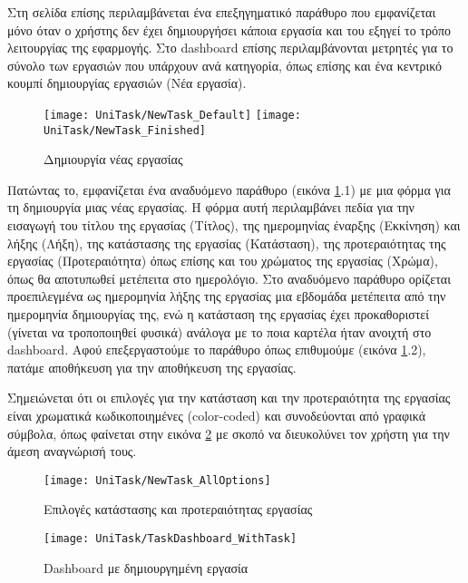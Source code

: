         Στη σελίδα επίσης περιλαμβάνεται ένα επεξηγηματικό παράθυρο που εμφανίζεται μόνο όταν ο χρήστης δεν έχει δημιουργήσει κάποια εργασία και του εξηγεί το τρόπο λειτουργίας της εφαρμογής. Στο {\Zona dashboard} επίσης περιλαμβάνονται μετρητές για το σύνολο των εργασιών που υπάρχουν ανά κατηγορία, όπως επίσης και ένα κεντρικό κουμπί δημιουργίας εργασιών ({\Zona Νέα εργασία}).

        \begin{figure}[h!] \noindent \centering
            \texttt{[image: UniTask/NewTask\_Default]}
            \texttt{[image: UniTask/NewTask\_Finished]}
            \caption{\centering Δημιουργία νέας εργασίας}
            \label{fig:unitask_NewTask}
        \end{figure}

        Πατώντας το, εμφανίζεται ένα αναδυόμενο παράθυρο (εικόνα \ref{fig:unitask_NewTask}.1) με μια φόρμα για τη δημιουργία μιας νέας εργασίας. Η φόρμα αυτή περιλαμβάνει πεδία για την εισαγωγή του τίτλου της εργασίας ({\Zona Τίτλος}), της ημερομηνίας έναρξης ({\Zona Εκκίνηση}) και λήξης ({\Zona Λήξη}), της κατάστασης της εργασίας ({\Zona Κατάσταση}), της προτεραιότητας της εργασίας ({\Zona Προτεραιότητα}) όπως επίσης και του χρώματος της εργασίας ({\Zona Χρώμα}), όπως θα αποτυπωθεί μετέπειτα στο ημερολόγιο. Στο αναδυόμενο παράθυρο ορίζεται προεπιλεγμένα ως ημερομηνία λήξης της εργασίας μια εβδομάδα μετέπειτα από την ημερομηνία δημιουργίας της, ενώ η κατάσταση της εργασίας έχει προκαθοριστεί (γίνεται να τροποποιηθεί φυσικά) ανάλογα με το ποια καρτέλα ήταν ανοιχτή στο dashboard. Αφού επεξεργαστούμε το παράθυρο όπως επιθυμούμε (εικόνα \ref{fig:unitask_NewTask}.2), πατάμε αποθήκευση για την αποθήκευση της εργασίας.

        Σημειώνεται ότι οι επιλογές για την κατάσταση και την προτεραιότητα της εργασίας είναι χρωματικά κωδικοποιημένες (color-coded) και συνοδεύονται από γραφικά σύμβολα, όπως φαίνεται στην εικόνα \ref{fig:unitask_NewTask_AllOptions} με σκοπό να διευκολύνει τον χρήστη για την άμεση αναγνώρισή τους.

        \begin{figure}[h!] \noindent \centering
            \texttt{[image: UniTask/NewTask\_AllOptions]}
            \caption{\centering Επιλογές κατάστασης και προτεραιότητας εργασίας}
            \label{fig:unitask_NewTask_AllOptions}
        \end{figure}

        \begin{figure}[h!] \noindent \centering
            \texttt{[image: UniTask/TaskDashboard\_WithTask]}
            \caption{\centering Dashboard με δημιουργημένη εργασία}
            \label{fig:unitask_TaskDashboard_WithTask}
        \end{figure}

